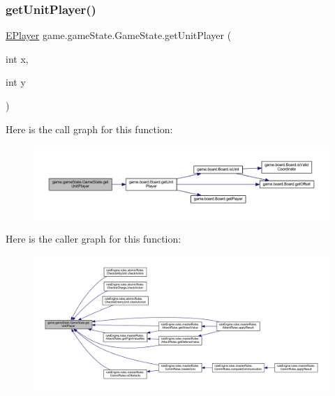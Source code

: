 \subsubsection{\texorpdfstring{get\+Unit\+Player()}{getUnitPlayer()}}
{\footnotesize\ttfamily \mbox{\hyperlink{enumgame_1_1_e_player}{E\+Player}} game.\+game\+State.\+Game\+State.\+get\+Unit\+Player (\begin{DoxyParamCaption}\item[{int}]{x,  }\item[{int}]{y }\end{DoxyParamCaption})\hspace{0.3cm}{\ttfamily [inline]}}

Here is the call graph for this function\+:
\nopagebreak
\begin{figure}[H]
\begin{center}
\leavevmode
\includegraphics[width=350pt]{classgame_1_1game_state_1_1_game_state_a270d806134a05500cc970ced6bee81bc_cgraph}
\end{center}
\end{figure}
Here is the caller graph for this function\+:
\nopagebreak
\begin{figure}[H]
\begin{center}
\leavevmode
\includegraphics[width=350pt]{classgame_1_1game_state_1_1_game_state_a270d806134a05500cc970ced6bee81bc_icgraph}
\end{center}
\end{figure}
\mbox{\label{classgame_1_1game_state_1_1_game_state_aab7480b446f4745f84e9a8831692a472}} 

